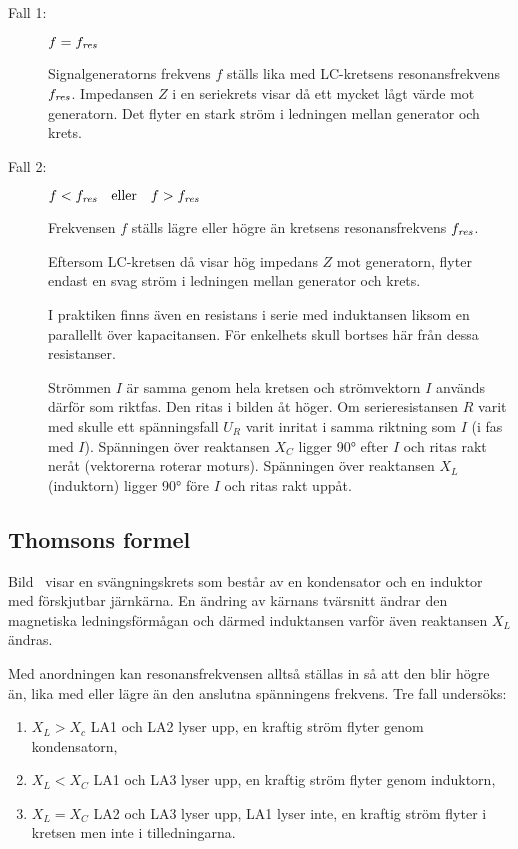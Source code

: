 \begin{description}
\item[Fall 1:] \(f = f_{\it res}\)

Signalgeneratorns frekvens \(f\) ställs lika med LC-kretsens resonansfrekvens
\(f_{\it res}\).
Impedansen \(Z\) i en seriekrets visar då ett mycket lågt värde mot generatorn.
Det flyter en stark ström i ledningen mellan generator och krets.

\item[Fall 2:] \(f < f_{\it res} \quad \text{eller} \quad f > f_{\it res}\)

Frekvensen \(f\) ställs lägre eller högre än kretsens resonansfrekvens
\(f_{\it res}\).

Eftersom LC-kretsen då visar hög impedans \(Z\) mot generatorn, flyter
endast en svag ström i ledningen mellan generator och krets.

I praktiken finns även en resistans i serie med induktansen liksom en
parallellt över kapacitansen.
För enkelhets skull bortses här från dessa resistanser.

Strömmen \(I\) är samma genom hela kretsen och strömvektorn \(I\) används
därför som riktfas.
Den ritas i bilden åt höger.
Om serieresistansen \(R\) varit med skulle ett spänningsfall \(U_R\) varit
inritat i samma riktning som \(I\) (i fas med \(I\)).
Spänningen över reaktansen \(X_C\) ligger \ang{90} efter \(I\) och ritas
rakt neråt (vektorerna roterar moturs).
Spänningen över reaktansen \(X_L\) (induktorn) ligger \ang{90} före \(I\) och
ritas rakt uppåt.
\end{description}

\subsection{Thomsons formel}


Bild~ visar en svängningskrets som består av en
kondensator och en induktor med förskjutbar järnkärna.
En ändring av kärnans tvärsnitt ändrar den magnetiska ledningsförmågan och
därmed induktansen varför även reaktansen \(X_L\) ändras.

Med anordningen kan resonansfrekvensen alltså ställas in så att den blir högre
än, lika med eller lägre än den anslutna spänningens frekvens.
Tre fall undersöks:
\begin{enumerate}
\item \(X_L > X_c\) LA1 och LA2 lyser upp, en kraftig ström flyter genom
  kondensatorn,
\item \(X_L < X_C\) LA1 och LA3 lyser upp, en kraftig ström flyter genom
  induktorn,
\item \(X_L= X_C\) LA2 och LA3 lyser upp, LA1 lyser inte, en kraftig ström
  flyter i kretsen men inte i tilledningarna.

\end{enumerate}

